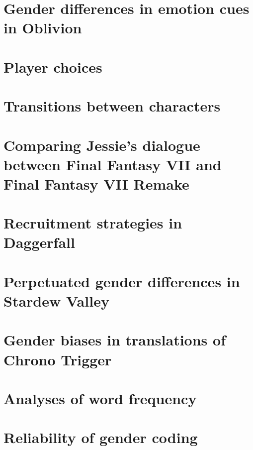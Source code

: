 \documentclass[12pt,a4paper]{article}
\newcommand{\includepdfPlus}[1]{}
\begin{document}
\includepdfPlus{../../analysis/survey/analyseSurvey.pdf}

\clearpage
\newpage
\section{Gender differences in emotion cues in Oblivion}

\includepdfPlus{../../analysis/Appendices/Analyse_Oblivion_Emotions.pdf}


\clearpage
\newpage
\section{Player choices}

\includepdfPlus{../../analysis/Analyse_PlayerChoices.pdf}

\clearpage
\newpage
\section{Transitions between characters}

\includepdfPlus{../../analysis/Analyse_Transitions.pdf}

\clearpage
\newpage
\section{Comparing Jessie's dialogue between Final Fantasy VII and Final Fantasy VII Remake}

\includepdfPlus{../../analysis/Appendices/JesseStudyEdited.pdf}


\clearpage
\newpage
\section{Recruitment strategies in Daggerfall}
\includepdfPlus{../../analysis/Appendices/Analyse_Daggerfall.pdf}


\clearpage
\newpage
\section{Perpetuated gender differences in Stardew Valley}
\includepdfPlus{../../analysis/Appendices/Analyse_StardewValley.pdf}

\clearpage
\newpage
\section{Gender biases in translations of Chrono Trigger}

\includepdfPlus{../../analysis/Appendices/Analyse_ChronoTriggerTranslations.pdf}

\clearpage
\newpage
\section{Analyses of word frequency}
\includepdfPlus{../../analysis/Analyse_Frequency.pdf}

\clearpage
\newpage
\section{Reliability of gender coding}
\includepdfPlus{../../analysis/reliability/Reliability.pdf}
\end{document}
